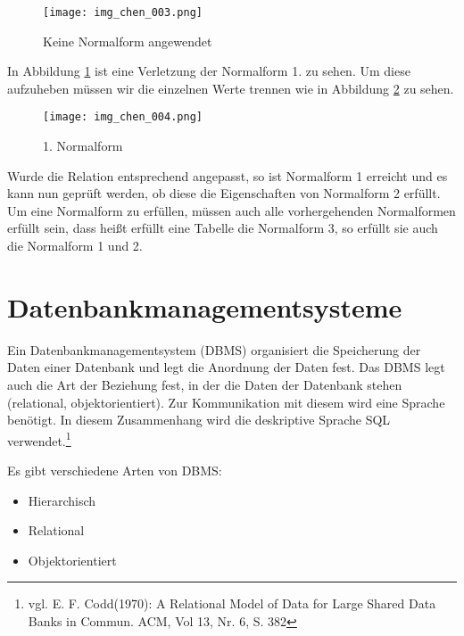 \begin{figure}[H]
\begin{center}
\texttt{[image: img\_chen\_003.png]}
\caption{Keine Normalform angewendet}
\label{chenpic4}
\end{center}
\end{figure}



In Abbildung \ref{chenpic4} ist eine Verletzung der Normalform 1. zu sehen. Um diese aufzuheben müssen wir die einzelnen Werte trennen wie in Abbildung \ref{chenpic5} zu sehen.

\begin{figure}[H]
\begin{center}
\texttt{[image: img\_chen\_004.png]}
\caption{1. Normalform}
\label{chenpic5}
\end{center}
\end{figure}

Wurde die Relation entsprechend angepasst, so ist Normalform 1 erreicht und es kann nun geprüft werden,
ob diese die Eigenschaften von Normalform 2 erfüllt.
Um eine Normalform zu erfüllen, müssen auch alle vorhergehenden Normalformen erfüllt sein, dass heißt erfüllt eine Tabelle die Normalform 3, so erfüllt sie auch die Normalform 1 und 2.


\section{Datenbankmanagementsysteme}
\label{sec:dbms}

Ein Datenbankmanagementsystem (DBMS) organisiert die Speicherung der Daten einer Datenbank und legt die Anordnung der Daten fest.
Das DBMS legt auch die Art der Beziehung fest, in der die Daten der Datenbank stehen (relational, objektorientiert).
Zur Kommunikation mit diesem wird eine Sprache benötigt. In diesem Zusammenhang wird die deskriptive Sprache SQL verwendet.\footnote{vgl. E. F. Codd(1970): A Relational Model of Data for Large Shared Data Banks in Commun. ACM, Vol 13, Nr. 6, S. 382}


Es gibt verschiedene Arten von DBMS:

\begin{itemize}
\item Hierarchisch
\item Relational
\item Objektorientiert
\end{itemize}

